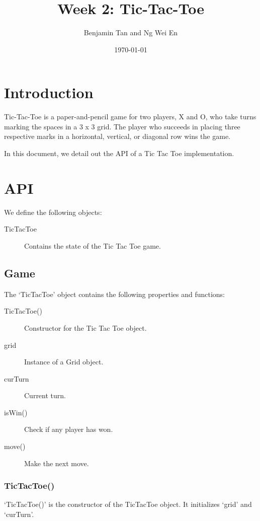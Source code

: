 \documentclass{article}
\title{Week 2: Tic-Tac-Toe}
\author{Benjamin Tan and Ng Wei En}
\date{\today}
\begin{document}
\maketitle

\section{Introduction}

Tic-Tac-Toe is a paper-and-pencil game for two players, X and O, who take turns marking the spaces in a 3 x 3 grid. The player who succeeds in placing three respective marks in a horizontal, vertical, or diagonal row wins the game.

In this document, we detail out the API of a Tic Tac Toe implementation.

\section{API}

We define the following objects:

\begin{description}
  \item[TicTacToe] Contains the state of the Tic Tac Toe game.
\end{description}

\subsection{Game}

The `TicTacToe' object contains the following properties and functions:

\begin{description}
  \item[TicTacToe()] Constructor for the Tic Tac Toe object.

  \item[grid] Instance of a Grid object.
  \item[curTurn] Current turn.

  \item[isWin()] Check if any player has won.
  \item[move()] Make the next move.
\end{description}

\subsubsection{TicTacToe()}

`TicTacToe()' is the constructor of the TicTacToe object. It initializes `grid' and `curTurn'.
\end{document}
